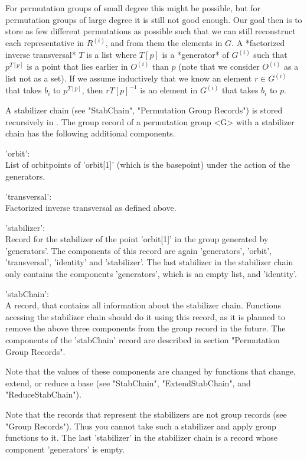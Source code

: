 For permutation groups of small degree this  might be  possible,  but for
permutation groups of large degree it is still not good enough.  Our goal
then is to store as  few different permutations as possible  such that we
can still reconstruct each representative in $R^{(i)}$, and from them the
elements in $G$.  A  *factorized inverse transversal* $T$ is a list where
$T[p]$ is a *generator* of $G^{(i)}$ such that $p^{T[p]}$ is a point that
lies earlier  in $O^{(i)}$ than $p$ (note that we consider $O^{(i)}$ as a
list not  as a set).  If we assume inductively that we know an element $r
\in G^{(i)}$ that  takes $b_i$ to $p^{T[p]}$, then  $r  T[p]^{-1}$  is an
element in $G^{(i)}$ that takes $b_i$ to $p$.

A stabilizer chain (see  "StabChain", "Permutation Group Records") is
stored recursively  in {\GAP}.  The  group  record of a permutation group
<G> with a stabilizer chain  has the following additional components.

'orbit':  \\
        List of orbitpoints of 'orbit[1]'  (which is the basepoint) under
        the action of the generators.

'transversal': \\
        Factorized inverse transversal as defined above.

'stabilizer': \\
        Record for the  stabilizer  of the point 'orbit[1]' in the  group
        generated  by  'generators'.  The components  of this  record are
        again 'generators', 'orbit', 'transversal', 'identity' and
	'stabilizer'.  The
        last  stabilizer  in  the  stabilizer  chain  only  contains  the
        components 'generators', which is an empty list, and 'identity'.

'stabChain': \\
	A record, that contains all information about the stabilizer chain.
	Functions acessing the stabilizer chain should do it using this
	record, as it is planned to remove the above three components from
	the group record in the future. The components of the 'stabChain'
	record are described in section "Permutation Group Records".

Note  that the values of these components are  changed by functions  that
change, extend, or reduce a base (see "StabChain", "ExtendStabChain",
and "ReduceStabChain").

Note  that the  records that represent  the  stabilizers  are  not  group
records  (see "Group Records").  Thus you cannot  take such a  stabilizer
and apply group functions to it.  The last 'stabilizer' in the stabilizer
chain is a record whose component 'generators' is empty.

